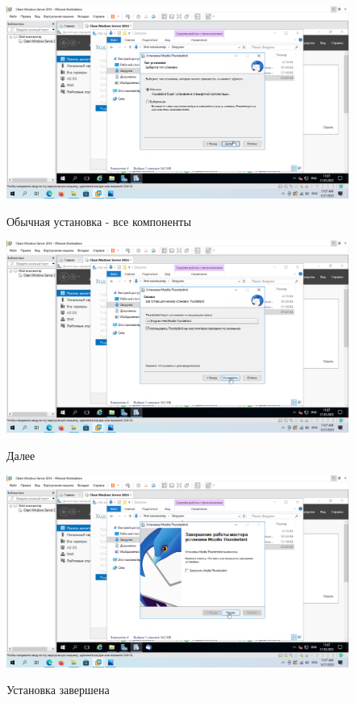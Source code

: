\documentclass[a4paper]{article}
\begin{document}
  \begin{figure}[H]
    \centering
    \includegraphics[width=\textwidth]{11_0031}
    \label{img:31}
    \caption{Обычная установка - все компоненты}
  \end{figure}

  \begin{figure}[H]
    \centering
    \includegraphics[width=\textwidth]{11_0032}
    \label{img:32}
    \caption{Далее}
  \end{figure}

  \begin{figure}[H]
    \centering
    \includegraphics[width=\textwidth]{11_0033}
    \label{img:33}
    \caption{Установка завершена}
  \end{figure}
\end{document}
